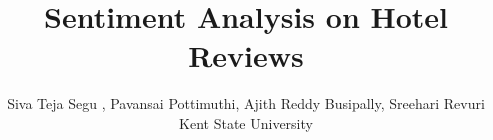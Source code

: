 \usepackage{filecontents}
\usepackage{cite}
\usepackage{amsmath,amssymb,amsfonts}
\usepackage{graphicx}
\usepackage{textcomp}
\usepackage{tabularx}
\usepackage{subcaption}
\usepackage{makecell}
\usepackage{url}
\usepackage[switch]{lineno}
\usepackage{listings}
\usepackage{multirow}

\captionsetup{compatibility=false}
\usepackage[margin=0.5in]{geometry}
\usepackage{textcomp}

\usepackage{listings}






\title{ Sentiment Analysis on Hotel Reviews}

\author{Siva Teja Segu , Pavansai Pottimuthi, Ajith Reddy Busipally, Sreehari Revuri \\
Kent State University}

